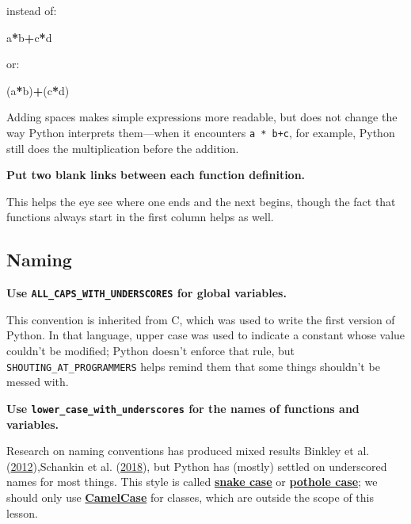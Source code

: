 \documentclass[
]{krantz}
\makeatletter
\newenvironment{Shaded}{\begin{snugshade}}{\end{snugshade}}
\newcommand{\NormalTok}[1]{#1}
\newcommand{\OperatorTok}[1]{\textcolor[rgb]{0.81,0.36,0.00}{\textbf{#1}}}
\newenvironment{kframe}{%
\medskip{}
\setlength{\fboxsep}{.8em}
 \def\at@end@of@kframe{}%
 \ifinner\ifhmode%
  \def\at@end@of@kframe{\end{minipage}}%
  \begin{minipage}{\columnwidth}%
 \fi\fi%
 \def\FrameCommand##1{\hskip\@totalleftmargin \hskip-\fboxsep
 \colorbox{shadecolor}{##1}\hskip-\fboxsep
     \hskip-\linewidth \hskip-\@totalleftmargin \hskip\columnwidth}%
 \MakeFramed {\advance\hsize-\width
   \@totalleftmargin\z@ \linewidth\hsize
   \@setminipage}}%
 {\par\unskip\endMakeFramed%
 \at@end@of@kframe}
\renewenvironment{Shaded}{\begin{kframe}}{\end{kframe}}
\newcommand{\gref}[2]{\hyperlink{#2}{\textbf{#1}}}
\makeatother
\begin{document}
instead of:

\begin{Shaded}
\begin{Highlighting}[]
\NormalTok{a}\OperatorTok{*}\NormalTok{b}\OperatorTok{+}\NormalTok{c}\OperatorTok{*}\NormalTok{d}
\end{Highlighting}
\end{Shaded}

or:

\begin{Shaded}
\begin{Highlighting}[]
\NormalTok{(a}\OperatorTok{*}\NormalTok{b)}\OperatorTok{+}\NormalTok{(c}\OperatorTok{*}\NormalTok{d)}
\end{Highlighting}
\end{Shaded}

Adding spaces makes simple expressions more readable,
but does not change the way Python interprets them---when it encounters \texttt{a~*~b+c},
for example,
Python still does the multiplication before the addition.

\textbf{Put two blank links between each function definition.}

This helps the eye see where one ends and the next begins,
though the fact that functions always start in the first column helps as well.

\hypertarget{naming}{%
\subsection{Naming}\label{naming}}

\textbf{Use \texttt{ALL\_CAPS\_WITH\_UNDERSCORES} for global variables.}

This convention is inherited from C,
which was used to write the first version of Python.
In that language,
upper case was used to indicate a constant whose value couldn't be modified;
Python doesn't enforce that rule,
but \texttt{SHOUTING\_AT\_PROGRAMMERS} helps remind them that
some things shouldn't be messed with.

\textbf{Use \texttt{lower\_case\_with\_underscores} for the names of functions and variables.}

Research on naming conventions has produced mixed results Binkley et al. (\protect\hyperlink{ref-Bink2012}{2012}),Schankin et al. (\protect\hyperlink{ref-Scha2018}{2018}),
but Python has (mostly) settled on underscored names for most things.
This style is called \gref{snake case}{snake\_case} or \gref{pothole case}{pothole\_case};
we should only use \gref{CamelCase}{camel\_case} for classes,
which are outside the scope of this lesson.
\end{document}
